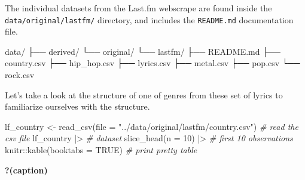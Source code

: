 \documentclass[
  letterpaper,
]{scrbook}
\newenvironment{Shaded}{\begin{snugshade}}{\end{snugshade}}
\newcommand{\AttributeTok}[1]{\textcolor[rgb]{0.00,0.00,0.00}{#1}}
\newcommand{\CommentTok}[1]{\textcolor[rgb]{0.00,0.00,0.00}{\textit{#1}}}
\newcommand{\ConstantTok}[1]{\textcolor[rgb]{0.00,0.00,0.00}{#1}}
\newcommand{\DecValTok}[1]{\textcolor[rgb]{0.00,0.00,0.00}{#1}}
\newcommand{\ExtensionTok}[1]{\textcolor[rgb]{0.00,0.00,0.00}{#1}}
\newcommand{\FunctionTok}[1]{\textcolor[rgb]{0.00,0.00,0.00}{#1}}
\newcommand{\NormalTok}[1]{\textcolor[rgb]{0.00,0.00,0.00}{#1}}
\newcommand{\OtherTok}[1]{\textcolor[rgb]{0.00,0.00,0.00}{#1}}
\newcommand{\SpecialCharTok}[1]{\textcolor[rgb]{0.00,0.00,0.00}{#1}}
\newcommand{\StringTok}[1]{\textcolor[rgb]{0.00,0.00,0.00}{#1}}
\begin{document}
The individual datasets from the Last.fm webscrape are found inside the
\texttt{data/original/lastfm/} directory, and includes the
\texttt{README.md} documentation file.

\begin{Shaded}
\begin{Highlighting}[]
\ExtensionTok{data/}
\ExtensionTok{├──}\NormalTok{ derived/}
\ExtensionTok{└──}\NormalTok{ original/}
    \ExtensionTok{└──}\NormalTok{ lastfm/}
        \ExtensionTok{├──}\NormalTok{ README.md}
        \ExtensionTok{├──}\NormalTok{ country.csv}
        \ExtensionTok{├──}\NormalTok{ hip\_hop.csv}
        \ExtensionTok{├──}\NormalTok{ lyrics.csv}
        \ExtensionTok{├──}\NormalTok{ metal.csv}
        \ExtensionTok{├──}\NormalTok{ pop.csv}
        \ExtensionTok{└──}\NormalTok{ rock.csv}
\end{Highlighting}
\end{Shaded}

Let's take a look at the structure of one of genres from these set of
lyrics to familiarize ourselves with the structure.

\begin{Shaded}
\begin{Highlighting}[]
\NormalTok{lf\_country }\OtherTok{\textless{}{-}} \FunctionTok{read\_csv}\NormalTok{(}\AttributeTok{file =} \StringTok{"../data/original/lastfm/country.csv"}\NormalTok{) }\CommentTok{\# read the csv file}
\NormalTok{lf\_country }\SpecialCharTok{|\textgreater{}} \CommentTok{\# dataset}
  \FunctionTok{slice\_head}\NormalTok{(}\AttributeTok{n =} \DecValTok{10}\NormalTok{) }\SpecialCharTok{|\textgreater{}} \CommentTok{\# first 10 observations }
\NormalTok{knitr}\SpecialCharTok{::}\FunctionTok{kable}\NormalTok{(}\AttributeTok{booktabs =} \ConstantTok{TRUE}\NormalTok{) }\CommentTok{\# print pretty table}
\end{Highlighting}
\end{Shaded}

\begin{table}

\caption{\textbf{?(caption)}}

\end{table}
\end{document}
